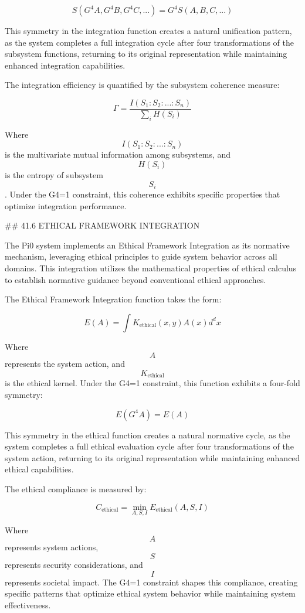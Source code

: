 $$ S(G^4 A, G^4 B, G^4 C, ...) = G^4 S(A, B, C, ...) $$

This symmetry in the integration function creates a natural unification pattern, as the system completes a full integration cycle after four transformations of the subsystem functions, returning to its original representation while maintaining enhanced integration capabilities.

The integration efficiency is quantified by the subsystem coherence measure:

$$ \Gamma = \frac{I(S_1:S_2:...:S_n)}{\sum_i H(S_i)} $$

Where $$ I(S_1:S_2:...:S_n) $$ is the multivariate mutual information among subsystems, and $$ H(S_i) $$ is the entropy of subsystem $$ S_i $$. Under the G4=1 constraint, this coherence exhibits specific properties that optimize integration performance.

## 41.6 ETHICAL FRAMEWORK INTEGRATION

The Pi0 system implements an Ethical Framework Integration as its normative mechanism, leveraging ethical principles to guide system behavior across all domains. This integration utilizes the mathematical properties of ethical calculus to establish normative guidance beyond conventional ethical approaches.

The Ethical Framework Integration function takes the form:

$$ E(A) = \int K_{\text{ethical}}(x, y) A(x) d^dx $$

Where $$ A $$ represents the system action, and $$ K_{\text{ethical}} $$ is the ethical kernel. Under the G4=1 constraint, this function exhibits a four-fold symmetry:

$$ E(G^4 A) = E(A) $$

This symmetry in the ethical function creates a natural normative cycle, as the system completes a full ethical evaluation cycle after four transformations of the system action, returning to its original representation while maintaining enhanced ethical capabilities.

The ethical compliance is measured by:

$$ C_{\text{ethical}} = \min_{A, S, I} E_{\text{ethical}}(A, S, I) $$

Where $$ A $$ represents system actions, $$ S $$ represents security considerations, and $$ I $$ represents societal impact. The G4=1 constraint shapes this compliance, creating specific patterns that optimize ethical system behavior while maintaining system effectiveness.

